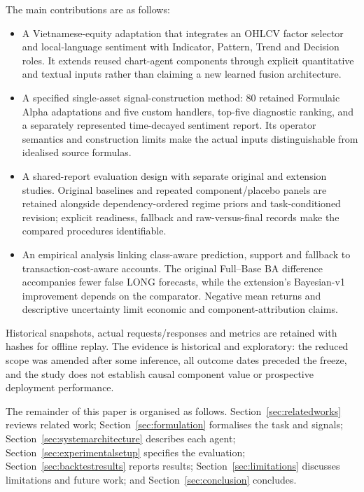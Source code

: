 The main contributions are as follows:
\begin{itemize}
\item A Vietnamese-equity adaptation that integrates an OHLCV factor selector and local-language sentiment with Indicator, Pattern, Trend and Decision roles. It extends reused chart-agent components through explicit quantitative and textual inputs rather than claiming a new learned fusion architecture.
\item A specified single-asset signal-construction method: 80 retained Formulaic Alpha adaptations and five custom handlers, top-five diagnostic ranking, and a separately represented time-decayed sentiment report. Its operator semantics and construction limits make the actual inputs distinguishable from idealised source formulas.
\item A shared-report evaluation design with separate original and extension studies. Original baselines and repeated component/placebo panels are retained alongside dependency-ordered regime priors and task-conditioned revision; explicit readiness, fallback and raw-versus-final records make the compared procedures identifiable.
\item An empirical analysis linking class-aware prediction, support and fallback to transaction-cost-aware accounts. The original Full--Base BA difference accompanies fewer false LONG forecasts, while the extension's Bayesian-v1 improvement depends on the comparator. Negative mean returns and descriptive uncertainty limit economic and component-attribution claims.
\end{itemize}

Historical snapshots, actual requests/responses and metrics are retained with hashes for offline replay. The evidence is historical and exploratory: the reduced scope was amended after some inference, all outcome dates preceded the freeze, and the study does not establish causal component value or prospective deployment performance.

The remainder of this paper is organised as follows. Section~\ref{sec:relatedworks} reviews related work; Section~\ref{sec:formulation} formalises the task and signals; Section~\ref{sec:systemarchitecture} describes each agent; Section~\ref{sec:experimentalsetup} specifies the evaluation; Section~\ref{sec:backtestresults} reports results; Section~\ref{sec:limitations} discusses limitations and future work; and Section~\ref{sec:conclusion} concludes.
